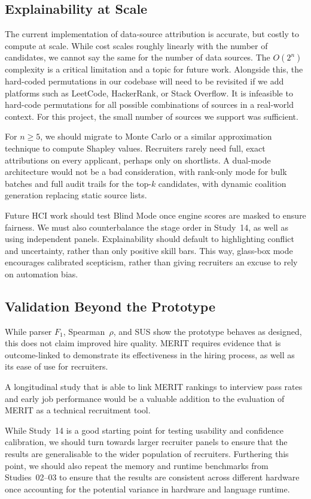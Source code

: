 \subsection{Explainability at Scale}
\label{subsec:future-explainability-scale}

The current implementation of data-source attribution is accurate, but costly to compute at scale.
While cost scales roughly linearly with the number of candidates, we cannot say the same for the number of data sources.
The $O(2^n)$ complexity is a critical limitation and a topic for future work.
Alongside this, the hard-coded permutations in our codebase will need to be revisited if we add platforms such as LeetCode, HackerRank, or Stack Overflow.
It is infeasible to hard-code permutations for all possible combinations of sources in a real-world context. For this project, the small number of
sources we support was sufficient.

For $n \ge 5$, we should migrate to Monte Carlo or a similar approximation technique to compute Shapley values.
Recruiters rarely need full, exact attributions on every applicant, perhaps only on shortlists. A dual-mode architecture would not be a bad
consideration, with rank-only mode for bulk batches and full audit trails for the top-$k$ candidates, with dynamic coalition generation replacing
static source lists.

Future HCI work should test Blind Mode once engine scores are masked to ensure fairness. We must also counterbalance the stage order in Study~14,
as well as using independent panels. Explainability should default to highlighting conflict and uncertainty, rather than only positive skill bars.
This way, glass-box mode encourages calibrated scepticism, rather than giving recruiters an excuse to rely on automation bias.

\subsection{Validation Beyond the Prototype}
\label{subsec:future-validation}

While parser $F_1$, Spearman~$\rho$, and SUS show the prototype behaves as designed, this does not claim improved hire quality.
MERIT requires evidence that is outcome-linked to demonstrate its effectiveness in the hiring process, as well as its ease of use for recruiters.

A longitudinal study that is able to link MERIT rankings to interview pass rates and early job performance would be a valuable addition
to the evaluation of MERIT as a technical recruitment tool. 

While Study~14 is a good starting point for testing usability and confidence calibration, we should turn 
towards larger recruiter panels to ensure that the results are generalisable to the wider population of recruiters. Furthering this
point, we should also repeat the memory and runtime benchmarks from Studies~02--03 to ensure that the results are consistent across different hardware
once accounting for the potential variance in hardware and language runtime. 